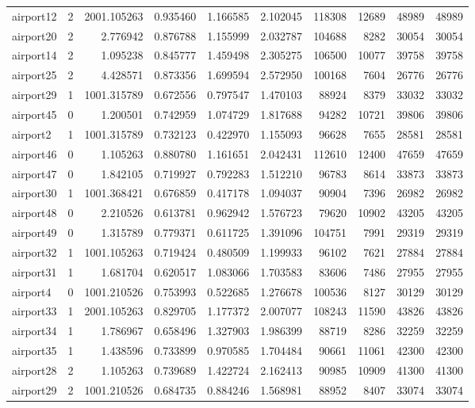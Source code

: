 \begin{longtable}{|l|r|r|r|r|r|r|r|r|r|}
airport12 & 2 & 2001.105263 & 0.935460 & 1.166585 & 2.102045 & 118308 & 12689 & 48989 & 48989 \\
airport20 & 2 & 2.776942 & 0.876788 & 1.155999 & 2.032787 & 104688 & 8282 & 30054 & 30054 \\
airport14 & 2 & 1.095238 & 0.845777 & 1.459498 & 2.305275 & 106500 & 10077 & 39758 & 39758 \\
airport25 & 2 & 4.428571 & 0.873356 & 1.699594 & 2.572950 & 100168 & 7604 & 26776 & 26776 \\
airport29 & 1 & 1001.315789 & 0.672556 & 0.797547 & 1.470103 & 88924 & 8379 & 33032 & 33032 \\
airport45 & 0 & 1.200501 & 0.742959 & 1.074729 & 1.817688 & 94282 & 10721 & 39806 & 39806 \\
airport2 & 1 & 1001.315789 & 0.732123 & 0.422970 & 1.155093 & 96628 & 7655 & 28581 & 28581 \\
airport46 & 0 & 1.105263 & 0.880780 & 1.161651 & 2.042431 & 112610 & 12400 & 47659 & 47659 \\
airport47 & 0 & 1.842105 & 0.719927 & 0.792283 & 1.512210 & 96783 & 8614 & 33873 & 33873 \\
airport30 & 1 & 1001.368421 & 0.676859 & 0.417178 & 1.094037 & 90904 & 7396 & 26982 & 26982 \\
airport48 & 0 & 2.210526 & 0.613781 & 0.962942 & 1.576723 & 79620 & 10902 & 43205 & 43205 \\
airport49 & 0 & 1.315789 & 0.779371 & 0.611725 & 1.391096 & 104751 & 7991 & 29319 & 29319 \\
airport32 & 1 & 1001.105263 & 0.719424 & 0.480509 & 1.199933 & 96102 & 7621 & 27884 & 27884 \\
airport31 & 1 & 1.681704 & 0.620517 & 1.083066 & 1.703583 & 83606 & 7486 & 27955 & 27955 \\
airport4 & 0 & 1001.210526 & 0.753993 & 0.522685 & 1.276678 & 100536 & 8127 & 30129 & 30129 \\
airport33 & 1 & 2001.105263 & 0.829705 & 1.177372 & 2.007077 & 108243 & 11590 & 43826 & 43826 \\
airport34 & 1 & 1.786967 & 0.658496 & 1.327903 & 1.986399 & 88719 & 8286 & 32259 & 32259 \\
airport35 & 1 & 1.438596 & 0.733899 & 0.970585 & 1.704484 & 90661 & 11061 & 42300 & 42300 \\
airport28 & 2 & 1.105263 & 0.739689 & 1.422724 & 2.162413 & 90985 & 10909 & 41300 & 41300 \\
airport29 & 2 & 1001.210526 & 0.684735 & 0.884246 & 1.568981 & 88952 & 8407 & 33074 & 33074 \\

\end{longtable}
